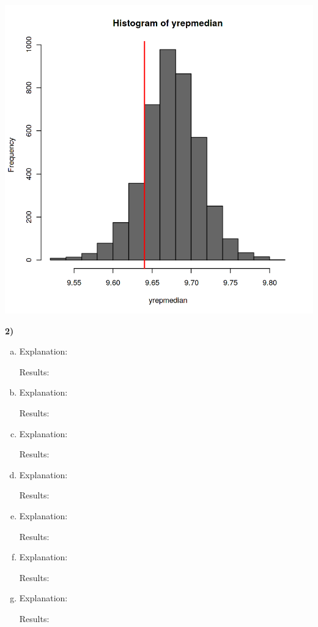 \documentclass[12pt,a4paper]{article}
\begin{document}
\begin{enumerate}[(a)]
\includegraphics[scale=0.17]{./images/1_Figure6_predictive_2.png}



\end{enumerate}

\noindent\textbf{2)}
\begin{enumerate}[(a)]
\item
Explanation:

Results:

\item
Explanation:

Results:

\item
Explanation:

Results:

\item
Explanation:

Results:

\item
Explanation:

Results:

\item
Explanation:

Results:

\item
Explanation:

Results:

\end{enumerate}
\end{document}
